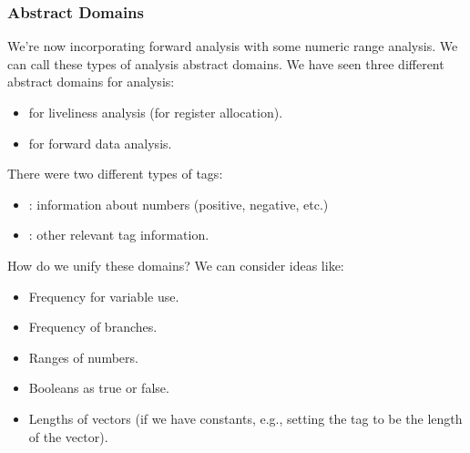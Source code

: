 \documentclass[letterpaper]{article}
\begin{document}
\subsubsection{Abstract Domains}
We're now incorporating forward analysis with some numeric range analysis. We can call these types of analysis abstract domains. We have seen three different abstract domains for analysis: 
\begin{itemize}
    \item {} for liveliness analysis (for register allocation).
    \item {} for forward data analysis. 
\end{itemize}
There were two different types of tags: 
\begin{itemize}
    \item {}: information about numbers (positive, negative, etc.)
    \item {}: other relevant tag information.
\end{itemize}
How do we unify these domains? We can consider ideas like: 
\begin{itemize}
    \item Frequency for variable use.
    \item Frequency of branches. 
    \item Ranges of numbers. 
    \item Booleans as true or false.
    \item Lengths of vectors (if we have constants, e.g., setting the tag to be the length of the vector).
\end{itemize}
\end{document}
